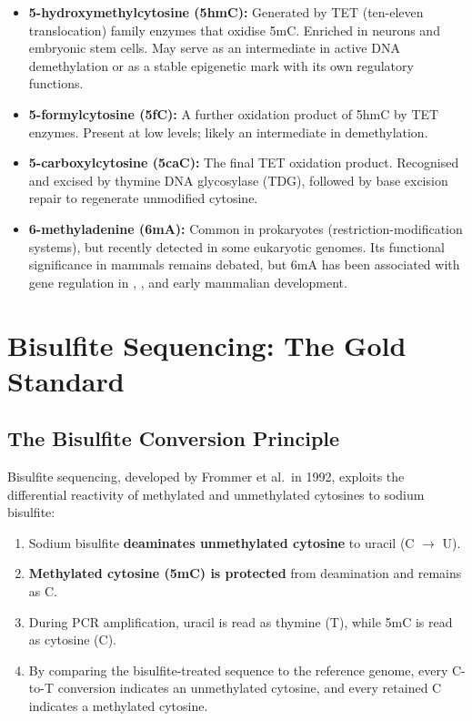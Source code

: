 \begin{itemize}[itemsep=3pt]
  \item \textbf{5-hydroxymethylcytosine (5hmC):} Generated by TET (ten-eleven translocation) family enzymes that oxidise 5mC. Enriched in neurons and embryonic stem cells. May serve as an intermediate in active DNA demethylation or as a stable epigenetic mark with its own regulatory functions.
  \item \textbf{5-formylcytosine (5fC):} A further oxidation product of 5hmC by TET enzymes. Present at low levels; likely an intermediate in demethylation.
  \item \textbf{5-carboxylcytosine (5caC):} The final TET oxidation product. Recognised and excised by thymine DNA glycosylase (TDG), followed by base excision repair to regenerate unmodified cytosine.
  \item \textbf{6-methyladenine (6mA):} Common in prokaryotes (restriction-modification systems), but recently detected in some eukaryotic genomes. Its functional significance in mammals remains debated, but 6mA has been associated with gene regulation in , , and early mammalian development.
\end{itemize}

\section{Bisulfite Sequencing: The Gold Standard}
\label{sec:methylation:bisulfite}

\subsection{The Bisulfite Conversion Principle}
\label{subsec:methylation:bisulfite-principle}

Bisulfite sequencing, developed by Frommer et al.\ in 1992, exploits the differential reactivity of methylated and unmethylated cytosines to sodium bisulfite:

\begin{enumerate}[itemsep=2pt]
  \item Sodium bisulfite \textbf{deaminates unmethylated cytosine} to uracil (C $\rightarrow$ U).
  \item \textbf{Methylated cytosine (5mC) is protected} from deamination and remains as C.
  \item During \acrshort{PCR} amplification, uracil is read as thymine (T), while 5mC is read as cytosine (C).
  \item By comparing the bisulfite-treated sequence to the reference genome, every C-to-T conversion indicates an unmethylated cytosine, and every retained C indicates a methylated cytosine.
\end{enumerate}

